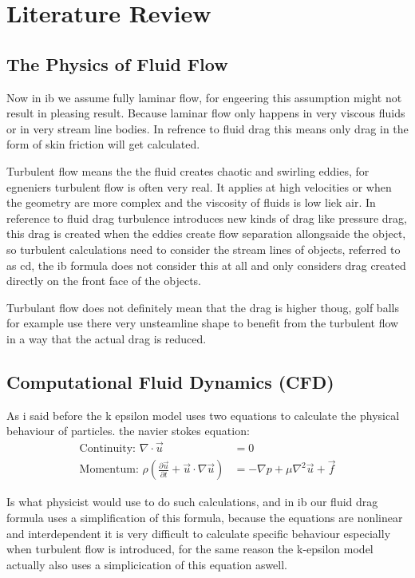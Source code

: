 \documentclass[12pt,a4paper]{article}
\begin{document}
\section{Literature Review}

\subsection{The Physics of Fluid Flow}

Now in ib we assume fully laminar flow, for engeering this assumption might not result in pleasing result. Because laminar flow only happens in very viscous fluids or in very stream line bodies. In refrence to fluid drag this means only drag in the form of skin friction will get calculated.

Turbulent flow means the the fluid creates chaotic and swirling eddies, for egneniers turbulent flow is often very real. It applies at high velocities or when the geometry are more complex and the viscosity of fluids is low liek air. In reference to fluid drag turbulence introduces new kinds of drag like pressure drag, this drag is created when the eddies create flow separation allongsaide the object, so turbulent calculations need to consider the stream lines of objects, referred to as cd, the ib formula does not consider this at all and only considers drag created directly on the front face of the objects. 

Turbulant flow does not definitely mean that the drag is higher thoug, golf balls for example use there very unsteamline shape to benefit from the turbulent flow in a way that the actual drag is reduced.

\subsection{Computational Fluid Dynamics (CFD)}

As i said before the k epsilon model uses two equations to calculate the physical behaviour of particles.
the navier stokes equation: 
\begin{align}
\text{Continuity: } \nabla \cdot \vec{u} &= 0\\
\text{Momentum: } \rho\left(\frac{\partial \vec{u}}{\partial t} + \vec{u} \cdot \nabla \vec{u}\right) &= -\nabla p + \mu \nabla^2 \vec{u} + \vec{f}
\end{align}

Is what physicist would use to do such calculations, and in ib our fluid drag formula uses a simplification of this formula, because the equations are nonlinear and interdependent it is very difficult to calculate specific behaviour especially when turbulent flow is introduced, for the same reason the k-epsilon model actually also uses a simplicication of this equation aswell.
\end{document}
